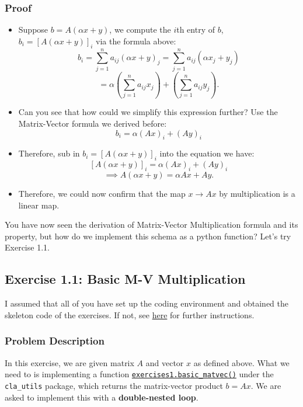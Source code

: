 \subsubsection*{Proof}
\begin{itemize}
    \item Suppose $b = A(\alpha x + y)$, we compute the $i$th entry of $b$,  $b_i = [A(\alpha x + y)]_{i}$ via the formula above:
      \[
        b_i = \sum_{j = 1}^{n} a_{ij}(\alpha x + y)_j =  \sum_{j = 1}^{n} a_{ij}(\alpha x_j + y_j)
      \]
      \[
        = \alpha(\sum_{j = 1}^{n} a_{ij} x_j) + (\sum_{j = 1}^{n} a_{ij} y_{j})
      .\]
    \item Can you see that how could we simplify this expression further? Use the Matrix-Vector formula we derived before:
      \[
        b_i = \alpha (Ax)_i + (Ay)_i
      \]
    \item Therefore, sub in $b_i = [A(\alpha x + y)]_i$ into the equation we have:
      \[
        [A(\alpha x + y)]_i = \alpha (Ax)_i + (Ay)_i
      \]
      \[
        \implies A(\alpha x + y) = \alpha Ax + Ay
      .\]
    \item Therefore, we could now confirm that the map $x \to Ax$ by multiplication is a linear map. \checked
\end{itemize}
You have now seen the derivation of Matrix-Vector Multiplication formula and its property, but how do we implement this schema as a python function? Let's try Exercise 1.1.
\subsection*{Exercise 1.1: Basic M-V Multiplication}
I assumed that all of you have set up the coding environment and obtained the skeleton code of the exercises. If not, see \href{https://comp-lin-alg.github.io/exercises.html}{here} for further instructions.
\subsubsection*{Problem Description}
In this exercise, we are given matrix $A$ and vector $x$ as defined above. What we need to is implementing a function \href{https://comp-lin-alg.github.io/cla_utils.html#cla_utils.exercises1.basic_matvec}{\texttt{exercises1.basic\_matvec()}}
under the \texttt{cla\_utils} package, which returns the matrix-vector product $b = Ax$. We are asked to implement this with a \textbf{double-nested loop}.


